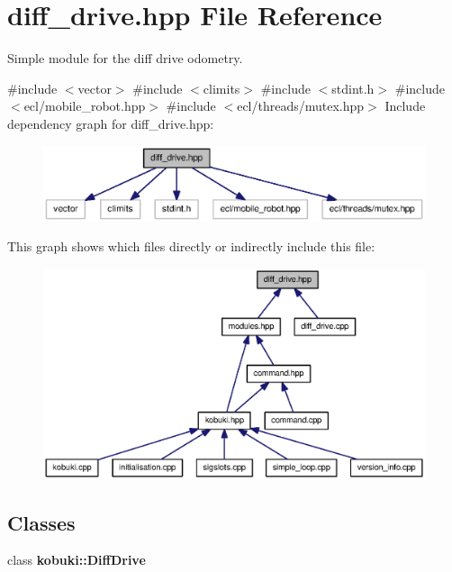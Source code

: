 \section{diff\-\_\-drive.\-hpp \-File \-Reference}
\label{diff__drive_8hpp}


\-Simple module for the diff drive odometry.  


{\ttfamily \#include $<$vector$>$}\*
{\ttfamily \#include $<$climits$>$}\*
{\ttfamily \#include $<$stdint.\-h$>$}\*
{\ttfamily \#include $<$ecl/mobile\-\_\-robot.\-hpp$>$}\*
{\ttfamily \#include $<$ecl/threads/mutex.\-hpp$>$}\*
\-Include dependency graph for diff\-\_\-drive.\-hpp\-:
\nopagebreak
\begin{figure}[H]
\begin{center}
\leavevmode
\includegraphics[width=350pt]{diff__drive_8hpp__incl}
\end{center}
\end{figure}
\-This graph shows which files directly or indirectly include this file\-:
\nopagebreak
\begin{figure}[H]
\begin{center}
\leavevmode
\includegraphics[width=350pt]{diff__drive_8hpp__dep__incl}
\end{center}
\end{figure}
\subsection*{\-Classes}
\begin{DoxyCompactItemize}
\item 
class {\bf kobuki\-::\-Diff\-Drive}
\end{DoxyCompactItemize}
